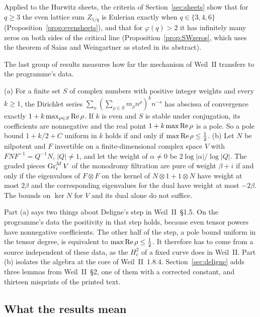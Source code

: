Applied to the Hurwitz sheets, the criteria of Section~\ref{sec:sheets} show that for $q\ge3$ the even lattice sum $Z_{1/q}$ is Eulerian exactly when $q\in\{3,4,6\}$ (Proposition~\ref{prop:evensheets}), and that for $\varphi(q)>2$ it has infinitely many zeros on both sides of the critical line (Proposition~\ref{prop:SWzeros}, which uses the theorem of Saias and Weingartner as stated in its abstract).

The last group of results measures how far the mechanism of Weil~II transfers to the programme's data.

\begin{introthm}
(a) For a finite set $S$ of complex numbers with positive integer weights and every $k\ge1$, the Dirichlet series $\sum_n(\sum_{\rho\in S}m_\rho n^\rho)^kn^{-s}$ has abscissa of convergence exactly $1+k\max_{\rho\in S}\operatorname{Re}\rho$. If $k$ is even and $S$ is stable under conjugation, its coefficients are nonnegative and the real point $1+k\max\operatorname{Re}\rho$ is a pole. So a pole bound $1+k/2+C$ uniform in $k$ holds if and only if $\max\operatorname{Re}\rho\le\tfrac12$.
(b) Let $N$ be nilpotent and $F$ invertible on a finite-dimensional complex space $V$ with $FNF^{-1}=Q^{-1}N$, $|Q|\ne1$, and let the weight of $\alpha\ne0$ be $2\log|\alpha|/\log|Q|$. The graded pieces $\operatorname{Gr}^M_iV$ of the monodromy filtration are pure of weight $\beta+i$ if and only if the eigenvalues of $F\otimes F$ on the kernel of $N\otimes1+1\otimes N$ have weight at most $2\beta$ and the corresponding eigenvalues for the dual have weight at most $-2\beta$. The bounds on $\ker N$ for $V$ and its dual alone do not suffice.
\end{introthm}

Part (a) says two things about Deligne's step in Weil~II~§1.5. On the programme's data the positivity in that step holds, because even tensor powers have nonnegative coefficients. The other half of the step, a pole bound uniform in the tensor degree, is equivalent to $\max\operatorname{Re}\rho\le\tfrac12$. It therefore has to come from a source independent of these data, as the $H^2_c$ of a fixed curve does in Weil~II. Part (b) isolates the algebra at the core of Weil~II~1.8.4. Section~\ref{sec:deligne} adds three lemmas from Weil~II~§2, one of them with a corrected constant, and thirteen misprints of the printed text.

\subsection*{What the results mean}

